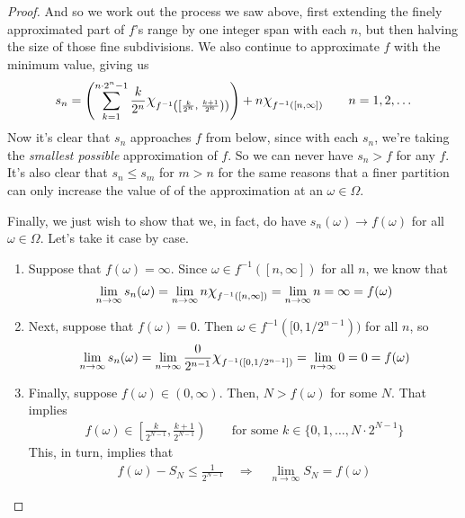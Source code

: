 \documentclass[12pt]{article}
\theoremstyle{plain}
\theoremstyle{definition}
\theoremstyle{remark}
\newcommand*{\Chi}{\mbox{\large$\chi$}} %
\begin{document}
\begin{proof}
And so we work out the process we saw above, first extending the finely
approximated part of $f$'s range by one integer span with each $n$, but
then halving the size of those fine subdivisions. We also continue to
approximate $f$ with the minimum value, giving us
\begin{align*}
  s_n = \left(\sum^{n\cdot 2^{n}-1}_{k=1}\frac{k}{2^{n}}
  \Chi_{f^{-1}\left( \left[\frac{k}{2^{n}}, \;
      \frac{k+1}{2^{n}} \right)\right)}\right)
      + n \Chi_{f^{-1}\left([n,\infty]\right)}
  \qquad n=1,2,\ldots
\end{align*}
Now it's clear that $s_n$ approaches $f$ from below, since with each
$s_n$, we're taking the \emph{smallest possible} approximation of $f$.
So we can never have $s_n>f$ for any $f$. It's also clear that $s_n\leq
s_m$ for $m>n$ for the same reasons that a finer partition can only
increase the value of of the approximation at an $\omega\in\Omega$.

Finally, we just wish to show that we, in fact, do have
$s_n(\omega)\rightarrow f(\omega)$ for all $\omega\in \Omega$. Let's
take it case by case.
\begin{enumerate}
  \item Suppose that $f(\omega)=\infty$. Since $\omega\in f^{-1}([n,\infty])$ for
    all $n$, we know that
    \begin{align*}
      \lim_{n\rightarrow\infty} s_n(\omega) = \lim_{n\rightarrow\infty}
      n\Chi_{f^{-1}([n,\infty])} = \lim_{n\rightarrow\infty}
      n = \infty = f(\omega)
    \end{align*}
  \item Next, suppose that $f(\omega) = 0$. Then $\omega\in f^{-1}([0,1/2^{n-1}))$
      for all $n$, so
      \begin{align*}
        \lim_{n\rightarrow\infty} s_n(\omega) = \lim_{n\rightarrow\infty}
        \frac{0}{2^{n-1}}\Chi_{f^{-1}([0,1/2^{n-1}])} =
        \lim_{n\rightarrow\infty} 0 = 0 = f(\omega)
      \end{align*}
  \item Finally, suppose $f(\omega)\in(0,\infty)$. Then, $N>f(\omega)$ for some $N$.
    That implies
    \begin{align*}
      f(\omega) \in \left[\frac{k}{2^{N-1}}, \frac{k+1}{2^{N-1}}\right)
          \qquad
      \text{for some $k\in\{0,1,\ldots,N\cdot 2^{N-1}\}$}
    \end{align*}
    This, in turn, implies that
    \begin{align*}
      f(\omega) - S_N \leq \frac{1}{2^{N-1}}
      \quad \Rightarrow\quad
      \lim_{n\rightarrow\infty}  S_N  =
      f(\omega)
    \end{align*}
\end{enumerate}
\end{proof}
\end{document}
